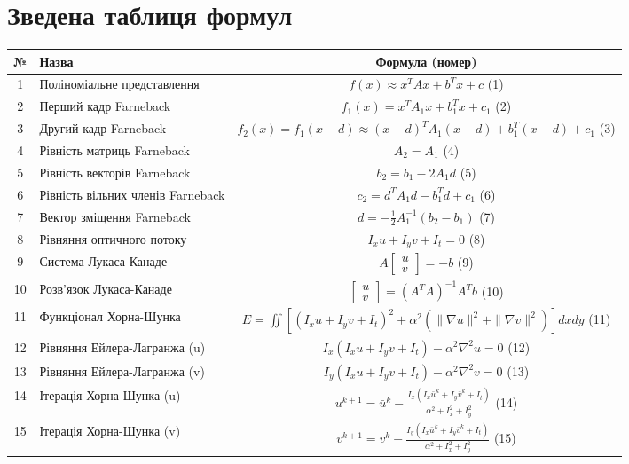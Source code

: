\documentclass[14pt, a4paper]{extarticle}
\numberwithin{equation}{section}
\begin{document}
\newpage

\section{Зведена таблиця формул}

\begin{longtable}{|c|p{10cm}|c|}
\hline
\textbf{№} & \textbf{Назва} & \textbf{Формула (номер)} \\
\hline
1 & Поліноміальне представлення & $f(x) \approx x^T A x + b^T x + c$ \hfill (1) \\
2 & Перший кадр Farneback & $f_1(x) = x^T A_1 x + b_1^T x + c_1$ \hfill (2) \\
3 & Другий кадр Farneback & $f_2(x) = f_1(x-d) \approx (x-d)^T A_1 (x-d) + b_1^T (x-d) + c_1$ \hfill (3) \\
4 & Рівність матриць Farneback & $A_2 = A_1$ \hfill (4) \\
5 & Рівність векторів Farneback & $b_2 = b_1 - 2A_1 d$ \hfill (5) \\
6 & Рівність вільних членів Farneback & $c_2 = d^T A_1 d - b_1^T d + c_1$ \hfill (6) \\
7 & Вектор зміщення Farneback & $d = -\frac{1}{2} A_1^{-1} (b_2 - b_1)$ \hfill (7) \\
8 & Рівняння оптичного потоку & $I_x u + I_y v + I_t = 0$ \hfill (8) \\
9 & Система Лукаса-Канаде & $A \begin{bmatrix}u\\v\end{bmatrix} = -b$ \hfill (9) \\
10 & Розв'язок Лукаса-Канаде & $\begin{bmatrix}u\\v\end{bmatrix} = (A^T A)^{-1} A^T b$ \hfill (10) \\
11 & Функціонал Хорна-Шунка & $E = \iint [(I_x u + I_y v + I_t)^2 + \alpha^2(\|\nabla u\|^2 + \|\nabla v\|^2)] dx dy$ \hfill (11) \\
12 & Рівняння Ейлера-Лагранжа (u) & $I_x(I_x u + I_y v + I_t) - \alpha^2 \nabla^2 u = 0$ \hfill (12) \\
13 & Рівняння Ейлера-Лагранжа (v) & $I_y(I_x u + I_y v + I_t) - \alpha^2 \nabla^2 v = 0$ \hfill (13) \\
14 & Ітерація Хорна-Шунка (u) & $u^{k+1} = \bar{u}^k - \frac{I_x(I_x\bar{u}^k + I_y\bar{v}^k + I_t)}{\alpha^2 + I_x^2 + I_y^2}$ \hfill (14) \\
15 & Ітерація Хорна-Шунка (v) & $v^{k+1} = \bar{v}^k - \frac{I_y(I_x\bar{u}^k + I_y\bar{v}^k + I_t)}{\alpha^2 + I_x^2 + I_y^2}$ \hfill (15) \\

\end{longtable}
\end{document}
